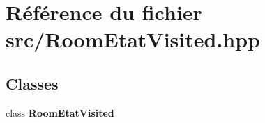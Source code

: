 \section{Référence du fichier src/\-Room\-Etat\-Visited.hpp}
\label{_room_etat_visited_8hpp}
\subsection*{Classes}
\begin{DoxyCompactItemize}
\item 
class {\bf Room\-Etat\-Visited}
\end{DoxyCompactItemize}
